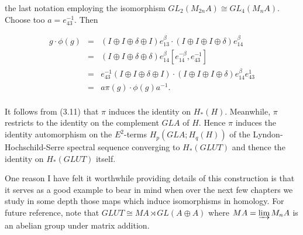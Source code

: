 \documentclass[openany,leqno]{book}  %
\begin{document}
the last notation employing the isomorphism $GL_2(M_{2n}A) \cong GL_4(M_nA)$. Choose too $a = e_{43}^{-1}$. Then

\begin{equation*}
\begin{array}{rcl}
g \cdot \phi(g) & = & (I\oplus I\oplus \delta \oplus I) e_{13}^\beta \cdot (I\oplus I\oplus I \oplus \delta ) e_{14}^\beta \\
& =& (I\oplus I\oplus \delta \oplus \delta ) e_{14}^\beta [e_{14}^{-\beta},e_{43}^{-1}] \\
& = & e_{43}^{-1}(I\oplus I\oplus \delta \oplus I ) \cdot (I\oplus I\oplus I \oplus \delta )e_{14}^{\beta}e_{43}^{1} \\
& =&a\pi(g)\cdot \phi(g) a^{-1} .\\
\end{array}
\end{equation*}

It follows from (3.11) that $\pi$ induces the identity on $H_*(H)$. Meanwhile, $\pi$ restricts to the identity on the complement $GLA$ of $H$. Hence $\pi$ induces the identity automorphism on the $E^2$-terms $H_p(GLA; H_q(H))$ of the Lyndon-Hochschild-Serre spectral sequence converging to $H_*(GLUT)$ and thence the identity on $H_*(GLUT)$ itself.

One reason I have felt it worthwhile providing details of this construction is that it serves as a good example to bear in mind when over the next few chapters we study in some depth those  maps which induce isomorphisms in homology. For future reference, note that $GLUT \cong MA \rtimes GL(A \oplus A)$ where $MA = \varinjlim M_nA$ is an abelian group under matrix addition. 
\end{document}
